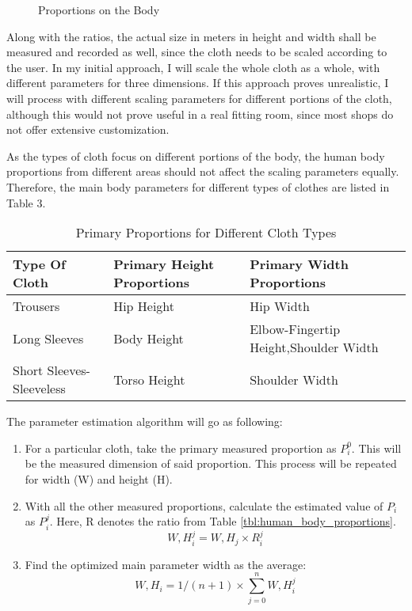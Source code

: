 \begin{figure}[h]
\centerline{}
\caption{Proportions on the Body}
\label{fig:body_proportions}
\end{figure}

Along with the ratios, the actual size in meters in height and width shall be measured and recorded as well, since the cloth needs to be scaled according to the user. In my initial approach, I will scale the whole cloth as a whole, with different parameters for three dimensions. If this approach proves unrealistic, I will process with different scaling parameters for different portions of the cloth, although this would not prove useful in a real fitting room, since most shops do not offer extensive customization.

As the types of cloth focus on different portions of the body, the human body proportions from different areas should not affect the scaling parameters equally. Therefore, the main body parameters for different types of clothes are listed in Table 3.

\begin{table}
\center
\begin{tabular}{ | p{3cm} | p{5cm} | p{5cm}  |}
\hline
\textbf{Type Of Cloth} & \textbf{Primary Height Proportions} & \textbf{Primary Width Proportions}  \\ \hline
Trousers & Hip Height & Hip Width \\ \hline
Long Sleeves & Body Height & Elbow-Fingertip Height,Shoulder Width \\ \hline
Short Sleeves-Sleeveless & Torso Height & Shoulder Width \\ 
\hline
\end{tabular}
\caption{Primary Proportions for Different Cloth Types}
\label{tbl:primary_proportions}
\end{table}

The parameter estimation algorithm will go as following:

\begin{enumerate}
\item For a particular cloth, take the primary measured proportion as $P_i^0$. This will be the measured dimension of said proportion. This process will be repeated for width (W) and height (H).
\item With all the other measured proportions, calculate the estimated value of $P_i$ as $P_i^j$. Here, R denotes the ratio from Table \ref{tbl:human_body_proportions}.
\begin{equation}
W,H_i^j=W,H_j \times R_i^j
\label{eqn:proportion_estimation}
\end{equation}
\item Find the optimized main parameter width as the average:
\begin{equation}
W,H_i=1/(n+1) \times \sum\limits_{j=0}^n W,H_i^j
\label{eqn:optimized_parameter}
\end{equation}
\end{enumerate}

